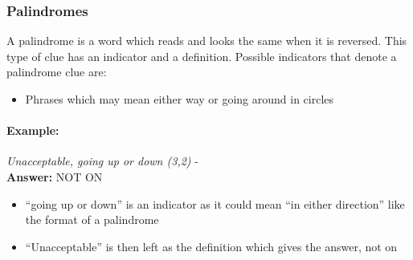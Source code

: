 \subsubsection{Palindromes}

A palindrome is a word which reads and looks the same when it is reversed. This
type of clue has an indicator and a definition.  Possible indicators that denote
a palindrome clue are:

\begin{itemize} 
    \item Phrases which may mean either way or going around in circles
\end{itemize}

\paragraph{Example:} \emph{Unacceptable, going up or down (3,2)} - \citep{connorPalindromes12} \\
\textbf{Answer:} NOT ON 

\begin{itemize}
    \item ``going up or down'' is an indicator as it could mean ``in either 
    direction'' like the format of a palindrome 
    \item ``Unacceptable'' is then left as the definition which gives the 
    answer, not on 
\end{itemize}
